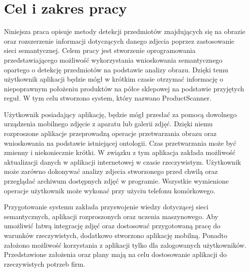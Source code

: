 \section{Cel i zakres pracy}
Niniejsza praca opisuje metody detekcji przedmiotów znajdujących się na obrazie oraz rozszerzenie informacji dotyczących danego zdjecia poprzez zastosowanie sieci semantycznej. Celem pracy jest stworzenie oprogramowania przedstawiającego możliwość wykorzystania wnioskowania semantycznego opartego o detekcję przedmiotów na podstawie analizy obrazu. Dzięki temu użytkownik aplikacji będzie mógł w krótkim czasie otrzymać informację o niepoprawnym położeniu produktów na półce sklepowej na podstawie przyjętych reguł. W tym celu stworzono system, który nazwano ProductScanner.

Użytkownik posiadający aplikację, będzie mógł przesłać za pomocą dowolnego urządzenia mobilnego zdjęcie z aparatu lub galerii zdjęć. Dzięki niemu rozproszone aplikacje przeprowadzą operacje przetwarzania obrazu oraz wnioskowania na podstawie istniejącej ontologii. Czas przetwarzania może być zmienny i niekoniecznie krótki. W związku z tym aplikacja zakłada możliwość aktualizacji danych w aplikacji internetowej w czasie rzeczywistym. Użytkownik może zarówno dokonywać analizy zdjecia stworzonego przed chwilą oraz przeglądać archiwum dostępnych zdjęć w programie. Wszystkie wymienione operacje użytkownik może wykonać przy użyciu telefonu komórkowego.

Przygotowanie systemu zakłada przyswojenie wiedzy dotyczącej sieci semantycznych, aplikacji rozproszonych oraz uczenia maszynowego. Aby umożliwić łatwą integrację zdjęć oraz dostosować przygotowaną pracę do warunków rzeczywistych, dodatkowo stworzono aplikację mobilną. Ponadto założono możliwość korzystania z aplikacji tylko dla zalogowanych użytkowników. Przedstawione założenia oraz plany mają na celu dostosowanie aplikacji do rzeczywistych potrzeb firm.